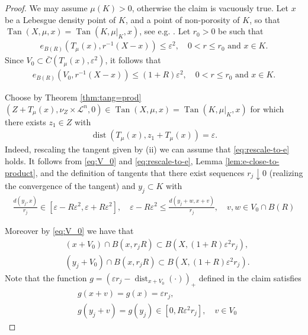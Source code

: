 \documentclass{amsart}
\numberwithin{equation}{section}
\newcommand{\leb}{\mathcal{L}}
\newcommand{\dist}{\operatorname{dist}}
\newcommand{\inv}{^{-1}}
\newcommand{\Tan}{\operatorname{Tan}}
\begin{document}
\begin{proof}
We may assume $\mu(K)>0$, otherwise the claim is vacuously true. Let $x$ be a Lebesgue density point of $K$, and a point of non-porosity  
 of $K$, so that $\Tan(X,\mu,x)=\Tan(K,\mu|_K,x)$, see e.g. \cite[Lemma 5.9 and Proposition 5.13]{soultaniscakovic}. Let $r_0>0$ be such that 
\begin{align*}
    e_{B(R)}(T_\mu(x),r\inv(X-x))\le \varepsilon^2,\quad 0<r\le r_0\mbox{ and }x\in K.
\end{align*}
Since $V_0\subset \bar C(T_\mu(x),\varepsilon^2)$, it follows that
\begin{align}\label{eq:V_0}
e_{B(R)}(V_0,r\inv(X-x))\le (1+R)\varepsilon^2, \quad 0<r\le r_0\mbox{ and }x\in K.
\end{align}

Choose by Theorem \ref{thm:tang=prod} $(Z+T_\mu(x),\nu_Z\times \leb^n,0)\in \Tan(X,\mu,x)=\Tan(K,\mu|_K,x)$ for which there exists $z_1\in Z$ with
\begin{align}\label{eq:rescale-to-e}
\dist(T_\mu(x),z_1+T_\mu(x))=\varepsilon.
\end{align}
Indeed, rescaling the tangent given by (ii) we can assume that \eqref{eq:rescale-to-e} holds. It follows from \eqref{eq:V_0} and \eqref{eq:rescale-to-e}, Lemma \ref{lem:e-close-to-product}, and the definition of tangents that there exist sequences $r_j\downarrow 0$ (realizing the convergence of the tangent) and  $y_j\subset K$ with 
\begin{align*}
\frac{d(y_j,x)}{r_j}\in [\varepsilon-R\varepsilon^2,\varepsilon+R\varepsilon^2],\quad\varepsilon-R\varepsilon^2\le \frac{d(y_j+w,x+v)}{r_j},\quad  v,w\in V_0\cap B(R)
\end{align*}


Moreover by \eqref{eq:V_0} we have that 
\begin{align*}
&(x+V_0)\cap B(x,r_jR)\subset B(X,(1+R)\varepsilon^2 r_j),\\
&(y_j+V_0)\cap B(x,r_jR)\subset B(X,(1+R)\varepsilon^2 r_j).
\end{align*}
Note that the function $g=(\varepsilon r_j-\dist_{x+V_0}(\cdot))_+$ defined in the claim satisfies
\begin{align*}
&g(x+v)=g(x)=\varepsilon r_j,\\
&g(y_j+v)=g(y_j)\in [0,R\varepsilon^2r_j], \quad v\in V_0
\end{align*}


\end{proof}
\end{document}
